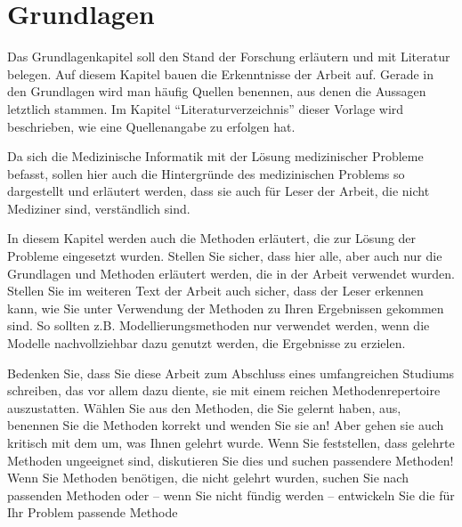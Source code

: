 \chapter{Grundlagen}\label{ch:preliminaries}

Das Grundlagenkapitel soll den Stand der Forschung erläutern und mit Literatur belegen.
Auf diesem Kapitel bauen die Erkenntnisse der Arbeit auf.
Gerade in den Grundlagen wird man häufig Quellen benennen, aus denen die Aussagen letztlich stammen.
Im Kapitel \enquote{Literaturverzeichnis} dieser Vorlage wird beschrieben, wie eine Quellenangabe zu erfolgen hat.

Da sich die Medizinische Informatik mit der Lösung medizinischer Probleme befasst, sollen hier auch die Hintergründe des medizinischen Problems so dargestellt und erläutert werden, dass sie auch für Leser der Arbeit, die nicht Mediziner sind, verständlich sind.

In diesem Kapitel werden auch die Methoden erläutert, die zur Lösung der Probleme eingesetzt wurden.
Stellen Sie sicher, dass hier alle, aber auch nur die Grundlagen und Methoden erläutert werden, die in der Arbeit verwendet wurden.
Stellen Sie im weiteren Text der Arbeit auch sicher, dass der Leser erkennen kann, wie Sie unter Verwendung der Methoden zu Ihren Ergebnissen gekommen sind.
So sollten z.B. Modellierungsmethoden nur verwendet werden, wenn die Modelle nachvollziehbar dazu genutzt werden, die Ergebnisse zu erzielen.

Bedenken Sie, dass Sie diese Arbeit zum Abschluss eines umfangreichen Studiums schreiben, das vor allem dazu diente, sie mit einem reichen Methodenrepertoire auszustatten.
Wählen Sie aus den Methoden, die Sie gelernt haben, aus, benennen Sie die Methoden korrekt und wenden Sie sie an! Aber gehen sie auch kritisch mit dem um, was Ihnen gelehrt wurde.
Wenn Sie feststellen, dass gelehrte Methoden ungeeignet sind, diskutieren Sie dies und suchen passendere Methoden! Wenn Sie Methoden benötigen, die nicht gelehrt wurden, suchen Sie nach passenden Methoden oder -- wenn Sie nicht fündig werden -- entwickeln Sie die für Ihr Problem passende Methode 

